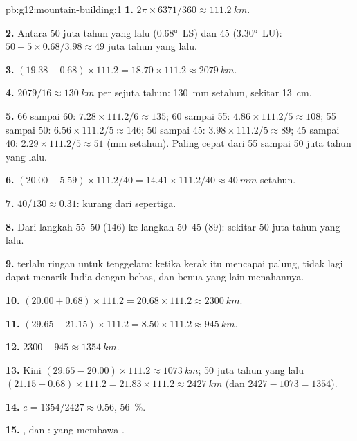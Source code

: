 \begin{solution}{pb:g12:mountain-building:1}
\textbf{1.} $2\pi \times 6371/360 \approx \qty{111.2}{km}$.

\textbf{2.} Antara 50 juta tahun yang lalu (\ang{0.68}~LS) dan 45 (\ang{3.30}~LU):
$50 - 5 \times 0.68/3.98 \approx 49$ juta tahun yang lalu.

\textbf{3.} $(19.38 - 0.68) \times 111.2 = 18.70 \times 111.2 \approx
\qty{2079}{km}$.

\textbf{4.} $2079/16 \approx \qty{130}{km}$ per sejuta tahun: \qty{130}{mm}
setahun, sekitar \qty{13}{cm}.

\textbf{5.} 66 sampai 60: $7.28 \times 111.2/6 \approx 135$; 60 sampai 55: $4.86
\times 111.2/5 \approx 108$; 55 sampai 50: $6.56 \times 111.2/5 \approx 146$; 50
sampai 45: $3.98 \times 111.2/5 \approx 89$; 45 sampai 40: $2.29 \times 111.2/5
\approx 51$ (\unit{mm} setahun). Paling cepat dari 55 sampai 50 juta tahun yang
lalu.

\textbf{6.} $(20.00 - 5.59) \times 111.2/40 = 14.41 \times 111.2/40 \approx
\qty{40}{mm}$ setahun.

\textbf{7.} $40/130 \approx 0.31$: kurang dari sepertiga.

\textbf{8.} Dari langkah 55--50 (146) ke langkah 50--45 (89): sekitar 50 juta
tahun yang lalu.

\textbf{9.}  terlalu ringan untuk tenggelam: ketika kerak itu
mencapai palung,  tidak lagi dapat menarik India dengan bebas, dan
benua yang lain menahannya.

\textbf{10.} $(20.00 + 0.68) \times 111.2 = 20.68 \times 111.2 \approx
\qty{2300}{km}$.

\textbf{11.} $(29.65 - 21.15) \times 111.2 = 8.50 \times 111.2 \approx
\qty{945}{km}$.

\textbf{12.} $2300 - 945 \approx \qty{1354}{km}$.

\textbf{13.} Kini $(29.65 - 20.00) \times 111.2 \approx \qty{1073}{km}$;
50 juta tahun yang lalu $(21.15 + 0.68) \times 111.2 = 21.83 \times 111.2
\approx \qty{2427}{km}$ (dan $2427 - 1073 = 1354$).

\textbf{14.} $e = 1354/2427 \approx 0.56$, \qty{56}{\percent}.

\textbf{15.} , dan :  yang membawa .


\end{solution}

